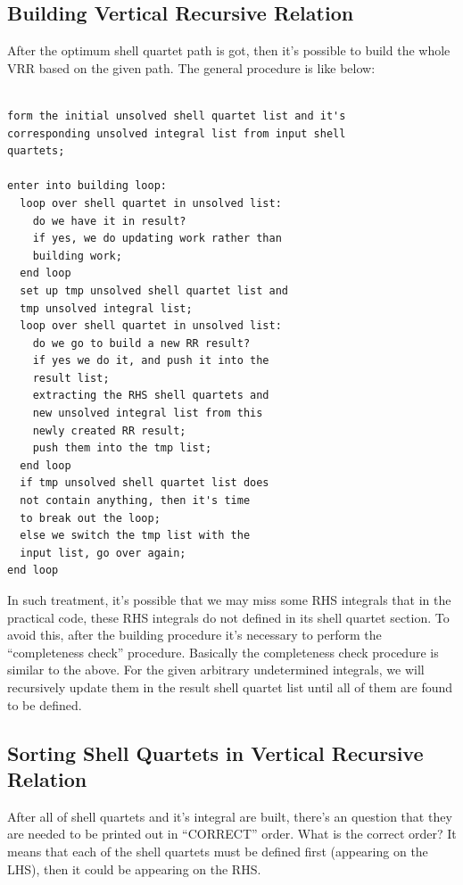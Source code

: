 \subsection{Building Vertical Recursive Relation}
%
%
\label{vrr_build}
After the optimum shell quartet path is got, then it's possible to 
build the whole VRR based on the given path. The general procedure
is like below:
\begin{verbatim}

form the initial unsolved shell quartet list and it's 
corresponding unsolved integral list from input shell 
quartets;

enter into building loop:
  loop over shell quartet in unsolved list:
    do we have it in result?
    if yes, we do updating work rather than
    building work;
  end loop
  set up tmp unsolved shell quartet list and 
  tmp unsolved integral list;
  loop over shell quartet in unsolved list:
    do we go to build a new RR result?
    if yes we do it, and push it into the 
    result list;
    extracting the RHS shell quartets and 
    new unsolved integral list from this 
    newly created RR result;
    push them into the tmp list;
  end loop
  if tmp unsolved shell quartet list does 
  not contain anything, then it's time 
  to break out the loop;
  else we switch the tmp list with the 
  input list, go over again;
end loop
\end{verbatim}

In such treatment, it's possible that we may miss some RHS integrals
that in the practical code, these RHS integrals do not defined in its 
shell quartet section. To avoid this, after the building procedure
it's necessary to perform the ``completeness check'' procedure. 
Basically the completeness check procedure is similar to the above.
For the given arbitrary undetermined integrals, we will recursively
update them in the result shell quartet list until all of them are 
found to be defined.

\subsection{Sorting Shell Quartets in Vertical Recursive Relation}
%
%
\label{sort_shell_quartet_vrr}

After all of shell quartets and it's integral are built, there's 
an question that they are needed to be printed out in ``CORRECT''
order. What is the correct order? It means that each of the 
shell quartets must be defined first (appearing on the LHS), 
then it could be appearing on the RHS.

